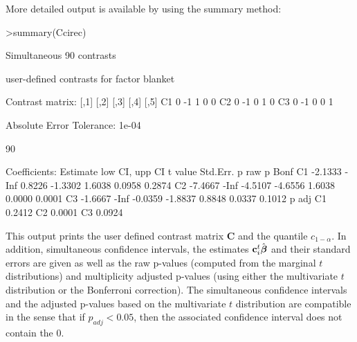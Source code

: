 \documentclass{article}
\newcommand{\bbeta}{\mbox{\boldmath $\beta$}}
\newcommand{\bc}{{\mathbf{c}}}
\newcommand{\bC}{{\mathbf{C}}}
\begin{document}
More detailed output is available by using the summary method:
\small
\begin{Schunk}
\begin{Sinput}
>summary(Ccirec)
\end{Sinput}
\begin{Soutput}
	Simultaneous 90% confidence intervals: user-defined
	contrasts

	 user-defined contrasts for factor blanket

Contrast matrix:
   [,1] [,2] [,3] [,4] [,5]
C1    0   -1    1    0    0
C2    0   -1    0    1    0
C3    0   -1    0    0    1

Absolute Error Tolerance:  1e-04 

 90 % quantile:  1.8431 

Coefficients:
   Estimate low CI,  upp CI t value Std.Err.  p raw p Bonf
C1  -2.1333    -Inf  0.8226 -1.3302   1.6038 0.0958 0.2874
C2  -7.4667    -Inf -4.5107 -4.6556   1.6038 0.0000 0.0001
C3  -1.6667    -Inf -0.0359 -1.8837   0.8848 0.0337 0.1012
    p adj
C1 0.2412
C2 0.0001
C3 0.0924
\end{Soutput}
\end{Schunk}
\normalsize
This output prints the user defined contrast matrix $\bC$ 
and the quantile $c_{1-\alpha}$. In addition,
simultaneous confidence intervals, the estimates $\bc_i^t
\hat{\bbeta}$ and their standard errors are given as well as the raw
p-values (computed from the marginal $t$ distributions) and
multiplicity adjusted p-values (using either the multivariate $t$ distribution or
the Bonferroni correction). The simultaneous confidence intervals
and the adjusted p-values based on the multivariate $t$ distribution are compatible in
the sense that if $p_{adj}<0.05$, then the associated confidence
interval does not contain the 0.
\end{document}
